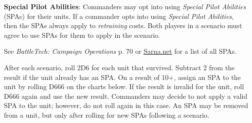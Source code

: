 \item {\bfseries Special Pilot Abilities}: Commanders may opt into using \emph{Special Pilot Abilities} (SPAs) for their units.
If a commander opts into using \emph{Special Pilot Abilities}, then the SPAs always apply to \emph{retraining} costs.
Both players in a scenario must agree to use SPAs for them to apply in the scenario.

See \emph{BattleTech: Campaign Operations} p. 70 or \href{https://sarna.net}{Sarna.net} for a list of all SPAs.

After each scenario, roll 2D6 for each unit that survived.
Subtract 2 from the result if the unit already has an SPA.
On a result of 10+, assign an SPA to the unit by rolling D666 on the charts below.
If the result is invalid for the unit, roll D666 again and use the new result.
Commanders may decide to not apply a valid SPA to the unit; however, do not roll again in this case.
An SPA may be removed from a unit, but only after rolling for new SPAs following a scenario.
